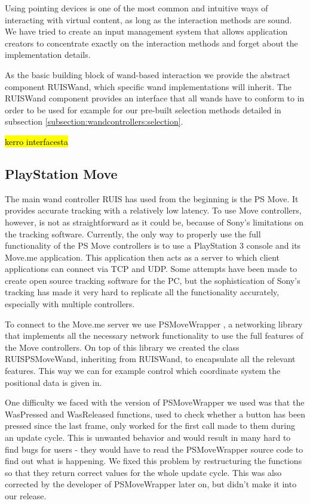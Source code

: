 \documentclass[12pt,a4paper,oneside,pdftex]{report}
\begin{document}
Using pointing devices is one of the most common and intuitive ways of interacting with virtual content, as long as the interaction methods are sound. We have tried to create an input management system that allows application creators to concentrate exactly on the interaction methods and forget about the implementation details. 

As the basic building block of wand-based interaction we provide the abstract component RUISWand, which specific wand implementations will inherit. The RUISWand component provides an interface that all wands have to conform to in order to be used for example for our pre-built selection methods detailed in subsection \ref{subsection:wandcontrollers:selection}.

\hl{kerro interfacesta}

\subsection{PlayStation Move}
\label{subsection:wandcontrollers:psmove}

The main wand controller RUIS has used from the beginning is the PS Move. It provides accurate tracking with a relatively low latency. To use Move controllers, however, is not as straightforward as it could be, because of Sony's limitations on the tracking software. Currently, the only way to properly use the full functionality of the PS Move controllers is to use a PlayStation 3 console and its Move.me application. This application then acts as a server to which client applications can connect via TCP and UDP. Some attempts have been made to create open source tracking software for the PC, but the sophistication of Sony's tracking has made it very hard to replicate all the functionality accurately, especially with multiple controllers.

To connect to the Move.me server we use PSMoveWrapper \cite{PSMoveWrapper}, a networking library that implements all the necessary network functionality to use the full features of the Move controllers. On top of this library we created the class RUISPSMoveWand, inheriting from RUISWand, to encapsulate all the relevant features. This way we can for example control which coordinate system the positional data is given in.

One difficulty we faced with the version of PSMoveWrapper we used was that the WasPressed and WasReleased functions, used to check whether a button has been pressed since the last frame, only worked for the first call made to them during an update cycle. This is unwanted behavior and would result in many hard to find bugs for users - they would have to read the PSMoveWrapper source code to find out what is happening. We fixed this problem by restructuring the functions so that they return correct values for the whole update cycle. This was also corrected by the developer of PSMoveWrapper later on, but didn't make it into our release.
\end{document}
